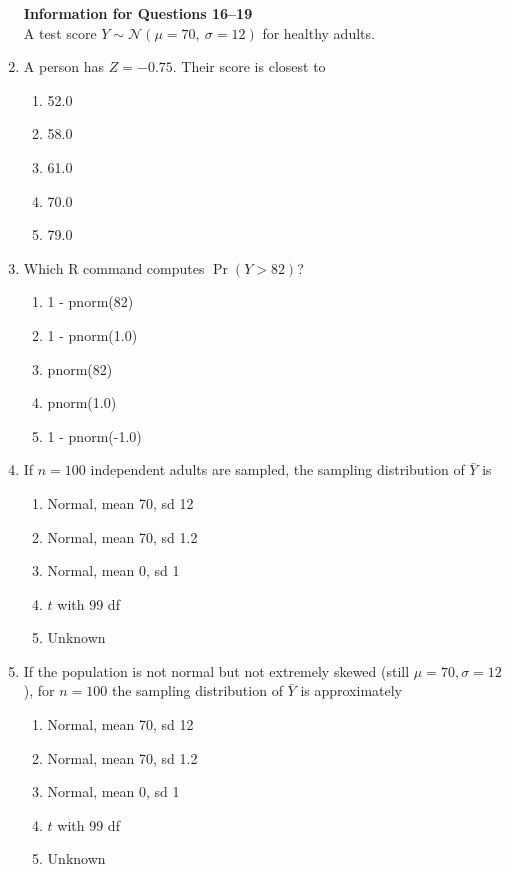 \documentclass{article}
\begin{document}
\begin{enumerate}
\textbf{Information for Questions 16--19}\\
A test score $Y\sim \mathcal N(\mu=70,\ \sigma=12)$ for healthy adults.
\item A person has $Z=-0.75$. Their score is closest to
    \begin{enumerate}[label=\Alph*.]
        \item 52.0
        \item 58.0
        \item 61.0
        \item 70.0
        \item 79.0
    \end{enumerate}
\item Which R command computes $\Pr(Y>82)$?
    \begin{enumerate}[label=\Alph*.]
        \item 1 - pnorm(82)
        \item 1 - pnorm(1.0)
        \item pnorm(82)
        \item pnorm(1.0)
        \item 1 - pnorm(-1.0)
    \end{enumerate}
\item If $n=100$ independent adults are sampled, the sampling distribution of $\bar Y$ is
    \begin{enumerate}[label=\Alph*.]
        \item Normal, mean 70, sd 12
        \item Normal, mean 70, sd 1.2
        \item Normal, mean 0, sd 1
        \item $t$ with 99 df
        \item Unknown
    \end{enumerate}
\item If the population is not normal but not extremely skewed (still $\mu=70,\sigma=12$), for $n=100$ the sampling distribution of $\bar Y$ is approximately
    \begin{enumerate}[label=\Alph*.]
        \item Normal, mean 70, sd 12
        \item Normal, mean 70, sd 1.2
        \item Normal, mean 0, sd 1
        \item $t$ with 99 df
        \item Unknown
    \end{enumerate}


\end{enumerate}
\end{document}
